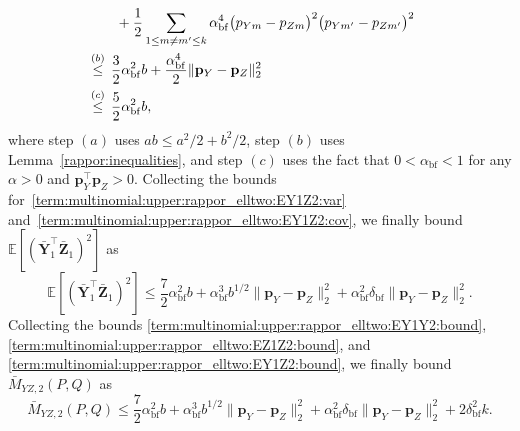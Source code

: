 \documentclass[twoside,11pt]{article}
\newcommand{\rvTwo}{Y}
\newcommand{\rvThree}{Z}
\newcommand{\vectorize}[1]{\mathbf{#1}}
\newcommand{\mE}{\mathbb{E}} %
\newcommand{\normSqMultinomMax}{b}
\newcommand{\alphabetSize}{k} %
\newcommand{\vectorIndex}{m}
\newcommand{\probVecElement}[2]{p_{{#1}{#2}}}
\newcommand{\probVec}{\mathbf{p}} %
\newcommand{\kernelMoment}{M} %
\newcommand{\dataGenDist}{P}  %
\newcommand{\privacyMechanism}{Q}
\newcommand{\privacyParameter}{\alpha} %
\newcommand{\privacyParameterrappor}{\privacyParameter_{\mathrm{bf}}}
\newcommand{\smallNumber}{\delta}
\newcommand{\smallNumberrappor}{\smallNumber_{\mathrm{bf}}}
\newcommand{\momentTwosampleExpSquareBar}{\bar{\kernelMoment}_{\rvTwo \rvThree,2}(\dataGenDist, \privacyMechanism)}
\begin{document}
\begin{appendix}
\begin{align*}
		\\ &~ +
		\frac{1}{2}
		\sum_{1 \leq \vectorIndex \neq \vectorIndex' \leq \alphabetSize}
		\privacyParameterrappor^4
		\bigl(  \probVecElement{\rvTwo}{\vectorIndex} - \probVecElement{\rvThree}{\vectorIndex}\bigr)^2
		\bigl(  \probVecElement{\rvTwo}{\vectorIndex'} - \probVecElement{\rvThree}{\vectorIndex'}\bigr)^2
		\\ \stackrel{(b)}{\leq}\hskip 1.57mm &
		\frac{3}{2} \privacyParameterrappor^2
		\normSqMultinomMax
		+
		\frac{\privacyParameterrappor^4
		}{2}
		\|\probVec_{\rvTwo} - \probVec_{\rvThree}\|_2^2
		\\ \stackrel{(c)}{\leq} \hskip 1.57mm &
		\frac{5}{2} \privacyParameterrappor^2
		\normSqMultinomMax,
	\end{align*}
	where step $(a)$ uses $ab \leq a^2/2 + b^2/2$, step $(b)$ uses Lemma~\ref{rappor:inequalities}, and step $(c)$ uses the fact that
	$0 < \privacyParameterrappor <1$ for any $\privacyParameter>0$
	and
	$\probVec_{\rvTwo}^\top \probVec_{\rvThree} > 0$.
	Collecting the bounds for~\eqref{term:multinomial:upper:rappor_elltwo:EY1Z2:var} and~\eqref{term:multinomial:upper:rappor_elltwo:EY1Z2:cov}, we finally bound $\mE[
	(
	\bar{\vectorize{\rvTwo}}_1^\top
	\bar{\vectorize{\rvThree}}_1)^2]
	$ as 
	\begin{equation}\label{term:multinomial:upper:rappor_elltwo:EY1Z2:bound}
		\mE[
		(
		\bar{\vectorize{\rvTwo}}_1^\top
		\bar{\vectorize{\rvThree}}_1)^2]
		\leq
		\frac{7}{2}
		\privacyParameterrappor^2 \normSqMultinomMax
		+
		\privacyParameterrappor^3
		\normSqMultinomMax^{1/2}
		\|\probVec_{\rvTwo} - \probVec_{\rvThree}\|_2^2
		+
		\privacyParameterrappor^2
		\smallNumberrappor
		\|\probVec_{\rvTwo} - \probVec_{\rvThree}\|_2^2.
	\end{equation}
	Collecting the bounds
	\eqref{term:multinomial:upper:rappor_elltwo:EY1Y2:bound},
	\eqref{term:multinomial:upper:rappor_elltwo:EZ1Z2:bound},
	and
	\eqref{term:multinomial:upper:rappor_elltwo:EY1Z2:bound}, we finally bound $\momentTwosampleExpSquareBar$ as
	\begin{equation}\label{inequality:rappor_elltwo_exp_square}
		\momentTwosampleExpSquareBar
		\leq
		\frac{7}{2}
		\privacyParameterrappor^2 \normSqMultinomMax
		+
		\privacyParameterrappor^3
		\normSqMultinomMax^{1/2}
		\|\probVec_{\rvTwo} - \probVec_{\rvThree}\|_2^2
		+
		\privacyParameterrappor^2
		\smallNumberrappor
		\|\probVec_{\rvTwo} - \probVec_{\rvThree}\|_2^2
		+
		2
		\smallNumberrappor^2 \alphabetSize.
	\end{equation}
	

\end{appendix}
\end{document}
